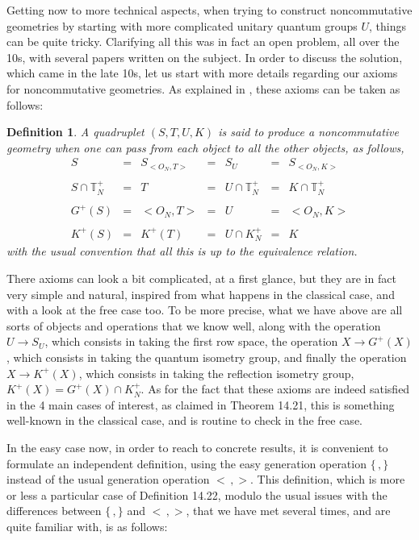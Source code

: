 \documentclass[12pt]{amsbook}
\newtheorem{definition}[theorem]{Definition}
\begin{document}
Getting now to more technical aspects, when trying to construct noncommutative geometries by starting with more complicated unitary quantum groups $U$, things can be quite tricky. Clarifying all this was in fact an open problem, all over the 10s, with several papers written on the subject. In order to discuss the solution, which came in the late 10s, let us start with more details regarding our axioms for noncommutative geometries. As explained in \cite{ba3}, these axioms can be taken as follows:

\begin{definition}
A quadruplet $(S,T,U,K)$ is said to produce a noncommutative geometry when one can pass from each object to all the other objects, as follows,
$$\begin{matrix}
S&=&S_{<O_N,T>}&=&S_U&=&S_{<O_N,K>}\\
\\
S\cap\mathbb T_N^+&=&T&=&U\cap\mathbb T_N^+&=&K\cap\mathbb T_N^+\\
\\
G^+(S)&=&<O_N,T>&=&U&=&<O_N,K>\\
\\
K^+(S)&=&K^+(T)&=&U\cap K_N^+&=&K
\end{matrix}$$
with the usual convention that all this is up to the equivalence relation.
\end{definition}

There axioms can look a bit complicated, at a first glance, but they are in fact very simple and natural, inspired from what happens in the classical case, and with a look at the free case too. To be more precise, what we have above are all sorts of objects and operations that we know well, along with the operation $U\to S_U$, which consists in taking the first row space, the operation $X\to G^+(X)$, which consists in taking the quantum isometry group, and finally the operation $X\to K^+(X)$, which consists in taking the reflection isometry group, $K^+(X)=G^+(X)\cap K_N^+$. As for the fact that these axioms are indeed satisfied in the 4 main cases of interest, as claimed in Theorem 14.21, this is something well-known in the classical case, and is routine to check in the free case.

\bigskip

In the easy case now, in order to reach to concrete results, it is convenient to formulate an independent definition, using the easy generation operation $\{\,,\}$ instead of the usual generation operation $<\,,>$. This definition, which is more or less a particular case of Definition 14.22, modulo the usual issues with the differences between $\{\,,\}$ and $<\,,>$, that we have met several times, and are quite familiar with, is as follows:
\end{document}
